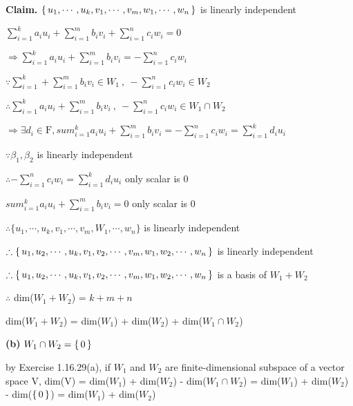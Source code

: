 \begin{tcolorbox}
	\begin{solution}
		\textbf{Claim.} $\left\{ \,u_1,\cdots,u_k,v_1,\cdots,v_m,w_1,\cdots,w_n \,\right\}$ is linearly independent
			
			$\sum^k_{i=1}a_iu_i + \sum^m_{i=1}b_iv_i + \sum^n_{i=1}c_iw_i = 0$
			
			$\Rightarrow \sum^k_{i=1}a_iu_i + \sum^m_{i=1}b_iv_i = -\sum^n_{i=1}c_iw_i$
			
			$\because \sum^{k}_{i=1} + \sum^{m}_{i=1}b_iv_i \in W_1~,~ -\sum^n_{i=1}c_iw_i \in W_2$
			
			$\therefore \sum^k_{i=1}a_iu_i + \sum^m_{i=1}b_iv_i~,~-\sum^n_{i=1}c_iw_i \in W_1 \cap W_2$
			
			$\Rightarrow \exists d_i \in \mathrm{F}, sum^k_{i=1}a_iu_i + \sum^m_{i=1}b_iv_i = -\sum^n_{i=1}c_iw_i = \sum^k_{i=1}d_iu_i$
			
			$\because \beta_1 , \beta_2$ is linearly independent
			
			$\therefore -\sum^n_{i=1}c_iw_i = \sum^k_{i=1}d_iu_i$ only scalar is 0
			
			$sum^k_{i=1}a_iu_i + \sum^m_{i=1}b_iv_i = 0$ only scalar is 0
			
			$\therefore \{u_1,\cdots,u_k,v_1,\cdots,v_m,W_1,\cdots,w_n\}$ is linearly independent
			
			$\therefore \left\{ \,u_1,u_2,\cdots,u_k,v_1,v_2,\cdots,v_m,w_1,w_2,\cdots,w_n \,\right\}$ is linearly independent
			
			$\therefore \left\{ \,u_1,u_2,\cdots,u_k,v_1,v_2,\cdots,v_m,w_1,w_2,\cdots,w_n \,\right\}$ is a basis of $W_1 + W_2$
			
			
			
			$\therefore$ dim($W_1 + W_2$) = $k+m+n$
			
			dim($W_1 + W_2$) = dim($W_1$) + dim($W_2$) + dim($W_1 \cap W_2$)
			
			\textbf{(b)} $W_1 \cap W_2 = \left\{ \,0 \,\right\}$
			
			by Exercise 1.16.29(a), if $W_1$ and $W_2$ are finite-dimensional subspace of a vector space V, dim(V) = dim($W_1$) + dim($W_2$) - dim($W_1 \cap W_2$) = dim($W_1$) + dim($W_2$) - dim($\left\{ \,0 \,\right\}$) = dim($W_1$) + dim($W_2$)
			
	\end{solution}
\end{tcolorbox}